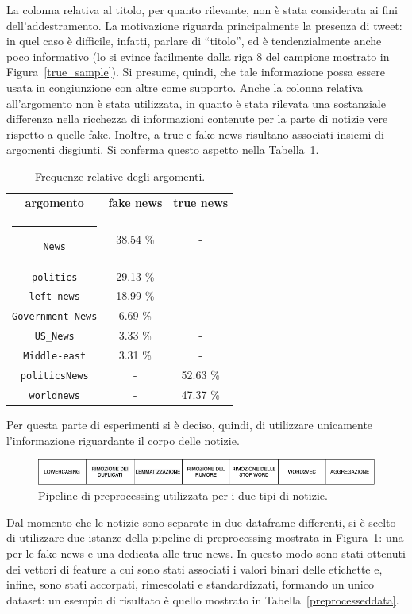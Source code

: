 \documentclass[12pt]{report}
\makeatletter
\theoremstyle{definition}
\newcommand{\thickhline}{%
    \noalign {\ifnum 0=`}\fi \hrule height 1pt
    \futurelet \reserved@a \@xhline
}
\makeatother
\begin{document}
La colonna relativa al titolo, per quanto rilevante, non è stata considerata ai fini dell'addestramento. La motivazione riguarda principalmente la presenza di tweet: in quel caso è difficile, infatti, parlare di ``titolo'', ed è tendenzialmente anche poco informativo (lo si evince facilmente dalla riga 8 del campione mostrato in Figura~\ref{true_sample}). Si presume, quindi, che tale informazione possa essere usata in congiunzione con altre come supporto.
Anche la colonna relativa all'argomento non è stata utilizzata, in quanto è stata rilevata una sostanziale differenza nella ricchezza di informazioni contenute per la parte di notizie vere rispetto a quelle fake. Inoltre, a true e fake news risultano associati insiemi di argomenti disgiunti. Si conferma questo aspetto nella Tabella~\ref{subject}.
\begin{table}
\centering
 \begin{tabular}{|c|c|c|} 
 \hline 
 \textbf{argomento} & \textbf{fake news} & \textbf{true news}
\\ [0.5ex] 
 \thickhline
\texttt{News} & 38.54 \% & - \\
\texttt{politics} & 29.13 \% & -\\ 
\texttt{left-news} & 18.99 \% & -\\
\texttt{Government News} & 6.69 \% & -\\
\texttt{US\_News} & 3.33 \% & -\\
\texttt{Middle-east} & 3.31 \% & -\\
\texttt{politicsNews} & - & 52.63 \% \\
\texttt{worldnews} & - & 47.37 \% \\
 \hline
\end{tabular}
\caption{Frequenze relative degli argomenti.}
\label{subject}
\end{table}
Per questa parte di esperimenti si è deciso, quindi, di utilizzare unicamente l'informazione riguardante il corpo delle notizie. 
\begin{figure}
    \centering
    \includegraphics[scale=0.5]{images/pipeline_inst.png}
    \caption{Pipeline di preprocessing utilizzata per i due tipi di notizie.}
    \label{pipe}
\end{figure}
Dal momento che le notizie sono separate in due dataframe differenti, si è scelto di utilizzare due istanze della pipeline di preprocessing mostrata in Figura~\ref{pipe}: una per le fake news e una dedicata alle true news. In questo modo sono stati ottenuti dei vettori di feature a cui sono stati associati i valori binari delle etichette e, infine, sono stati accorpati, rimescolati e standardizzati, formando un unico dataset: un esempio di risultato è quello mostrato in Tabella~\ref{preprocesseddata}.
\end{document}
